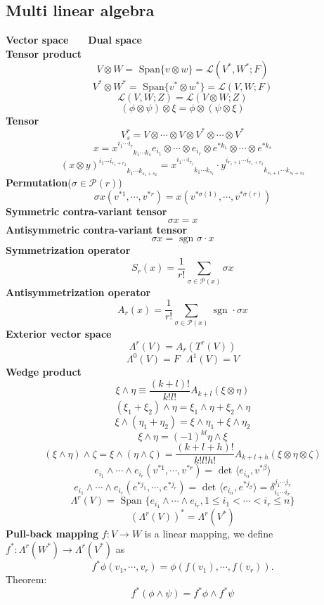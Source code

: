 \documentclass{article}
\begin{document}
\subsection{Multi linear algebra}
\textbf{Vector space}\ \ \ \ \textbf{Dual space}\\
\textbf{Tensor product}
\[V \otimes W = \mbox{ Span}\{ v \otimes w \} = \mathcal{L}(V^*,W^*;F)\]
\[V^* \otimes W^* = \mbox{ Span}\{ v^* \otimes w^* \} = \mathcal{L}(V,W;F)\]
\[\mathcal{L}(V,W;Z)=\mathcal{L}(V \otimes W;Z)\]
\[(\phi \otimes \psi)\otimes \xi = \phi \otimes (\psi \otimes \xi)\]
\textbf{Tensor}
\[V_s^r = V \otimes \cdots \otimes V \otimes V^* \otimes \cdots \otimes V^*\]
\[x=x^{i_1 \cdots i_r}_{\phantom{i_1 \cdots i_r} k_1 \cdots k_s} e_{i_1} \otimes \cdots \otimes e_{i_r} \otimes e^{*k_1} \otimes \cdots \otimes e^{*k_s}\]
\[(x \otimes y)^{i_1 \cdots i_{r_1+r_2}}_{\phantom{i_1 \cdots i_{r_1+r_2}} k_1 \cdots k_{s_1+s_2}} = 
x^{i_1 \cdots i_{r_1}}_{\phantom{i_1 \cdots i_{r_1}}k_1 \cdots k_{s_1}} \cdot y^{i_{r_1+1} \cdots i_{r_1+r_2}}_{\phantom{i_{r_1+1} \cdots i_{r_1+r_2}}k_{s_1+1} \cdots k_{s_1+s_2}}\]
\textbf{Permutation}($\sigma \in \mathcal{P}(r)$)
\[\sigma x(v^{*1},\cdots,v^{*r})=x(v^{*\sigma(1)},\cdots,v^{*\sigma(r)})\]
\textbf{Symmetric contra-variant tensor}
\[\sigma x =x\]
\textbf{Antisymmetric contra-variant tensor}
\[\sigma x =\mbox{ sgn }\sigma \cdot x\]
\textbf{Symmetrization operator}
\[S_r(x) = \frac{1}{r!} \sum_{\sigma \in \mathcal{P}(x)} \sigma x\]
\textbf{Antisymmetrization operator}
\[A_r(x) = \frac{1}{r!} \sum_{\sigma \in \mathcal{P}(x)} \mbox{ sgn }\cdot \sigma x\]
\textbf{Exterior vector space}
\[\Lambda^r(V) = A_r(T^r(V))\]
\[\Lambda^0(V)=F \ \ \ \Lambda^1(V)=V\]
\textbf{Wedge product}
\[\xi \wedge \eta \equiv \frac{(k+l)!}{k!l!}A_{k+l}(\xi \otimes \eta)\]
\[(\xi_1+\xi_2) \wedge \eta = \xi_1 \wedge \eta + \xi_2 \wedge \eta\]
\[\xi \wedge (\eta_1+\eta_2) = \xi \wedge \eta_1 + \xi \wedge \eta_2\]
\[\xi \wedge \eta = (-1)^{kl} \eta \wedge \xi\]
\[(\xi \wedge \eta) \wedge \zeta = \xi \wedge (\eta \wedge \zeta) = \frac{(k+l+h)!}{k!l!h!}A_{k+l+h}(\xi \otimes \eta \otimes \zeta)\]
\[e_{i_1} \wedge \cdots \wedge e_{i_r}(v^{*1},\cdots,v^{*r}) = \mbox{ det } \langle e_{i_{\alpha}},v^{*\beta} \rangle\]
\[e_{i_1} \wedge \cdots \wedge e_{i_r}(e^{*j_1},\cdots,e^{*j_r}) = \mbox{ det } \langle e_{i_{\alpha}},e^{*j_{\beta}} \rangle = \delta^{j_1 \cdots j_r}_{i_1 \cdots i_r}\]
\[\Lambda^r(V) = \mbox{ Span }\{e_{i_1} \wedge \cdots \wedge e_{i_r},1\leq i_1 < \cdots < i_r \leq n  \}\]
\[(\Lambda^r(V))^* = \Lambda^r(V^*)\]
\textbf{Pull-back mapping}
$f:V \to W$ is a linear mapping, we define $f^*:\Lambda^r(W^*) \to \Lambda^r(V^*)$ as
\[f^* \phi(v_1,\cdots,v_r) = \phi(f(v_1),\cdots,f(v_r)).\]
Theorem:
\[f^*(\phi \wedge \psi) = f^*\phi \wedge f^*\psi\]
\end{document}
